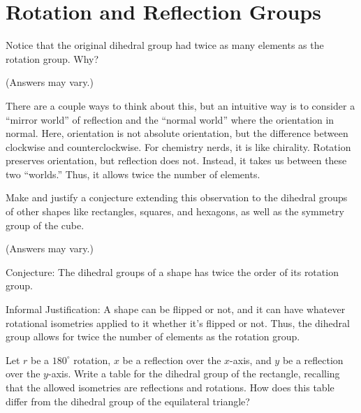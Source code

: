 \documentclass[../gatm_answers.tex]{subfiles}
\begin{document}
\section{Rotation and Reflection Groups}

\begin{outer_problem}[start=1]
\item Notice that the original dihedral group had twice as many elements as the rotation group. Why?
\end{outer_problem}

\noindent(Answers may vary.)

There are a couple ways to think about this, but an intuitive way is to consider a ``mirror world'' of reflection and the ``normal world'' where the orientation in normal. Here, orientation is not absolute orientation, but the difference between clockwise and counterclockwise. For chemistry nerds, it is like chirality. Rotation preserves orientation, but reflection does not. Instead, it takes us between these two ``worlds.'' Thus, it allows twice the number of elements.

\begin{outer_problem}
\item Make and justify a conjecture extending this observation to the dihedral groups of other shapes like rectangles, squares, and hexagons, as well as the symmetry group of the cube.
\end{outer_problem}

\noindent(Answers may vary.)

Conjecture: The dihedral groups of a shape has twice the order of its rotation group.

Informal Justification: A shape can be flipped or not, and it can have whatever rotational isometries applied to it whether it's flipped or not. Thus, the dihedral group allows for twice the number of elements as the rotation group.

\begin{outer_problem}
\item Let $r$ be a $180^{\circ}$ rotation, $x$ be a reflection over the $x$-axis, and $y$ be a reflection over the $y$-axis. Write a table for the dihedral group of the rectangle, recalling that the allowed isometries are reflections and rotations. How does this table differ from the dihedral group of the equilateral triangle? \label{prob:rectangle_group}
\end{outer_problem}
\end{document}

